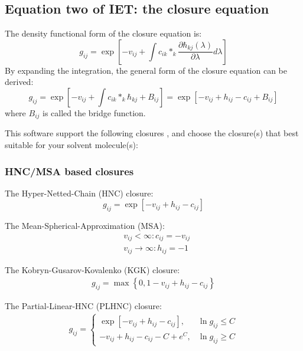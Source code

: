 \documentclass[aip,amsmath,amssymb,reprint,onecolumn]{revtex4-1}
\begin{document}
\subsection{Equation two of IET: the closure equation}\label{sec:closure}

The density functional form of the closure equation is:
\begin{equation}\label{eq:closure-original}
    g_{ij} = \exp\left[ -v_{ij} + \int c_{ik}*_k\frac{\partial\hbar_{kj}(\lambda)}{\partial\lambda} d\lambda \right]
\end{equation}
By expanding the integration, the general form of the closure equation can be derived:
\begin{equation}\label{eq:closure}
    g_{ij} = \exp\left[ -v_{ij} + \int c_{ik}*_k\hbar_{kj} + B_{ij} \right] = \exp\left[ -v_{ij} + h_{ij} - c_{ij} + B_{ij} \right]
\end{equation}
where $B_{ij}$ is called the bridge function.

This software support the following closures \cite{Ratkova_Maxi_CR_2015, Cao_Huang_AdTS_2019}, and choose the closure(s) that best suitable for your solvent molecule(s):

\subsubsection{HNC/MSA based closures}

The Hyper-Netted-Chain (HNC) closure:
\begin{equation}\label{eq:HNC}
    g_{ij} = \exp\left[ -v_{ij} + h_{ij} - c_{ij} \right]
\end{equation}

The Mean-Spherical-Approximation (MSA):
\begin{equation}\begin{split}\label{eq:MSA}
    &v_{ij}<\infty: c_{ij} = -v_{ij} \\
    &v_{ij}\rightarrow\infty: h_{ij} = -1
\end{split}\end{equation}

The Kobryn-Gusarov-Kovalenko (KGK) closure:
\begin{equation}\begin{split}\label{eq:KGK}
    g_{ij} = \max\left\{ 0, 1-v_{ij}+h_{ij}-c_{ij} \right\}
\end{split}\end{equation}

The Partial-Linear-HNC (PLHNC) closure:
\begin{equation}\begin{split}\label{eq:PLHNC}
    g_{ij} = \begin{cases}
        \exp\left[-v_{ij}+h_{ij}-c_{ij}\right], &\ln g_{ij}\le C\\
        -v_{ij}+h_{ij}-c_{ij} - C + e^C, &\ln g_{ij}\ge C
    \end{cases}
\end{split}\end{equation}
\end{document}
